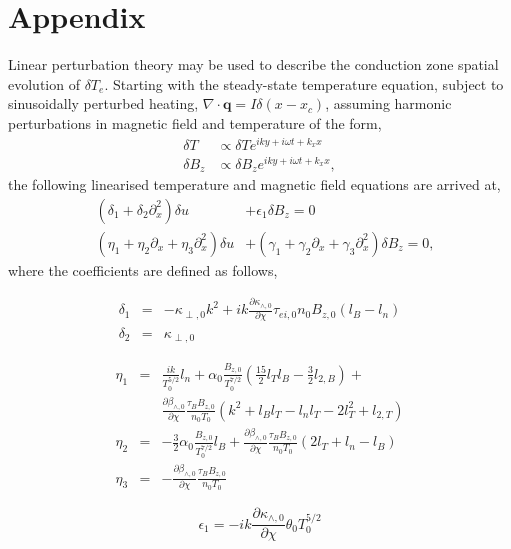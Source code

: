 \documentclass[aip,reprint]{revtex4-1}
\begin{document}
\section{Appendix}

\label{app:eigenmodes}
Linear perturbation theory may be used to describe the conduction zone spatial evolution of $\delta T_e$. Starting with the steady-state temperature equation, subject to sinusoidally perturbed heating, $\nabla \cdot \mathbf{q} = I\delta (x-x_c)$, assuming harmonic perturbations in magnetic field and temperature of the form,
\begin{eqnarray}
\delta T &\propto \delta T e^{iky + i \omega t + k_x x}\\
\delta B_z &\propto \delta B_z e^{iky + i \omega t + k_x x},
\end{eqnarray}
the following linearised temperature and magnetic field equations are arrived at,
\begin{eqnarray}
&(\delta_1 + \delta_2 \partial_x^2 )\delta u &+ \epsilon_1 \delta B_{z} = 0\\
&(\eta_1 + \eta_2 \partial_x + \eta_3 \partial^2_x)\delta u &+(\gamma_1 + \gamma_2 \partial_x + \gamma_3 \partial^2_x)\delta B_z= 0,
\end{eqnarray}
where the coefficients are defined as follows,

\begin{eqnarray}
\delta_1 &=& -\kappa_{\perp,0}k^2 + i k \frac{\partial \kappa_{\wedge,0}}{\partial \chi} \tau_{ei,0} n_0 B_{z,0}\left(l_B - l_n \right) \\
\delta_2 &=& \kappa_{\perp,0}
\end{eqnarray}

\begin{eqnarray}
\eta_1 &=& \frac{i k }{T_0^{5/2}} l_n +\alpha_0
\frac{ B_{z,0}}{T_0^{7/2}}\left(\frac{15}{2} l_T l_B - \frac{3}{2} l_{2,B}\right) + \nonumber\\
&&\frac{\partial \beta_{\wedge,0}}{\partial \chi}\frac{\tau_B B_{z,0}}{n_0 T_0}\left(k^2 + l_B l_T - l_n l_T - 2l_T^2 + l_{2,T} \right)\\
\eta_2 &=& - \frac{3}{2}\alpha_0\frac{B_{z,0}}{T_0^{7/2}}l_B + \frac{\partial \beta_{\wedge,0}}{\partial \chi}\frac{\tau_B B_{z,0}}{n_0 T_0} (2l_T + l_n - l_B) \\
\eta_3 &=& - \frac{\partial \beta_{\wedge,0}}{\partial \chi} \frac{\tau_B B_{z,0}}{n_0 T_0}
\end{eqnarray}

\begin{equation}
\epsilon_1 = -i k \frac{\partial \kappa_{\wedge,0}}{\partial \chi} \theta_0 T_0^{5/2} 
\end{equation}
\end{document}
